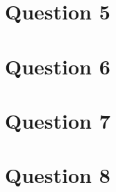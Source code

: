 \documentclass{article}
\begin{document}

\section*{Question 5}



\section*{Question 6}



\section*{Question 7}



\section*{Question 8}



\end{document}
